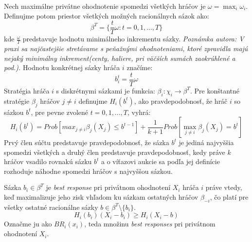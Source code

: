 \documentclass[a4paper, 11pt]{article}
\begin{document}
Nech maximálne privátne ohodnotenie spomedzi všetkých hráčov je $\omega = \max_{i} \omega_{i}$. Definujme potom priestor všetkých možných racionálnych sázok ako:
\begin{equation}
\beta^{T} = \{\frac{t}{T}\omega : t = 0,1,...,T\}
\end{equation}
kde $\frac{\omega}{T}$ predstavuje hodnotu minimálneho inkrementu sázky. \newline{}\newline{}
\textit{Poznámka autora: V praxi sa najčastejšie stretávame s peňažnými ohodnoteniami, ktoré zpravidla majú nejaký minimálny inkrement(centy, haliere, pri väčších sumách zaokrúhlené a pod.).}\newline{}\newline{}
Hodnotu konkrétnej sázky hráča $i$ značíme:
\begin{equation}
b_{i}^{t} = \frac{t}{T}\omega
\end{equation}
Stratégia hráča $i$ s diskrétnymi sázkami je funkcia: $\beta_{i}:\chi_i \to \beta^{T}$. Pre konštantné stratégie $\beta_{j}$ hráčov $j \ne i$ definujme $H_{i}(b^{t})$, ako pravdepodobnosť, že hráč $i$ so sázkou $b^{t}$, pre pevne zvolené $t = 0,1,...,T$, vyhrá:
\begin{equation}
\label{g1}
H_{i}(b^{t}) = Prob[max_{j \ne i}\beta_{j}(X_{j})\leq b^{t-1}] + \frac{1}{k+1}Prob[\max_{j \ne i} \beta_{j}(X_{j}) = b^{t}]
\end{equation}
Prvý člen súčtu predstavuje pravdepodobnosť, že sázka $b^{t}$ je jediná najvyššia spomedzi všetkých a druhý člen predstavuje pravdepodobnosť, kedy práve $k$ hráčov vsadilo rovnakú sázku $b^{t}$ a o víťazovi aukcie sa podľa jej definície rozhoduje náhodne spomedzi hráčov s najvyššou sázkou.

Sázka $b_{i} \in \beta^{T}$ je \textit{best response} pri privátnom ohodnotení $X_{i}$ hráča $i$ práve vtedy, keď maximalizuje jeho zisk vhľadom ku sázkam ostatných hráčov $\beta_{-i}$, čo platí pre všetky ostatné racionálne sázky $b \in \beta^{T} \setminus \{b_{i}\}$.
\begin{equation}
\label{g2}
H_{i}(b_{i})(X_{i} - b_{i}) \geq H_{i}(X_{i} - b)
\end{equation}
Označme ju ako $BR_{i}(x_{i})$, teda množinu \textit{best responses} pri privátnom ohodnotení $X_{i}$.
\end{document}
